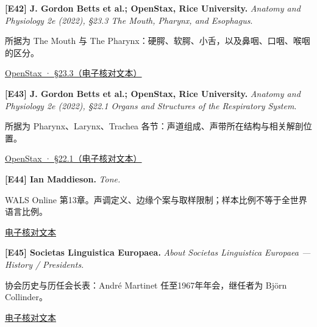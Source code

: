 \par\noindent\begin{minipage}{\linewidth}
\label{ref-42}\noindent\textbf{[E42] J. Gordon Betts et al.; OpenStax, Rice University.} \textit{Anatomy and Physiology 2e (2022), §23.3 The Mouth, Pharynx, and Esophagus}.\par\nobreak
所据为 The Mouth 与 The Pharynx：硬腭、软腭、小舌，以及鼻咽、口咽、喉咽的区分。\par
{\small\href{https://openstax.org/books/anatomy-and-physiology-2e/pages/23-3-the-mouth-pharynx-and-esophagus}{OpenStax · §23.3（电子核对文本）}}\par
\par\end{minipage}\par

\par\noindent\begin{minipage}{\linewidth}
\label{ref-43}\noindent\textbf{[E43] J. Gordon Betts et al.; OpenStax, Rice University.} \textit{Anatomy and Physiology 2e (2022), §22.1 Organs and Structures of the Respiratory System}.\par\nobreak
所据为 Pharynx、Larynx、Trachea 各节：声道组成、声带所在结构与相关解剖位置。\par
{\small\href{https://openstax.org/books/anatomy-and-physiology-2e/pages/22-1-organs-and-structures-of-the-respiratory-system}{OpenStax · §22.1（电子核对文本）}}\par
\par\end{minipage}\par

\par\noindent\begin{minipage}{\linewidth}
\label{ref-44}\noindent\textbf{[E44] Ian Maddieson.} \textit{Tone.}\par\nobreak
WALS Online 第13章。声调定义、边缘个案与取样限制；样本比例不等于全世界语言比例。\par
{\small\href{https://wals.info/chapter/13}{电子核对文本}}\par
\par\end{minipage}\par

\par\noindent\begin{minipage}{\linewidth}
\label{ref-45}\noindent\textbf{[E45] Societas Linguistica Europaea.} \textit{About Societas Linguistica Europaea — History / Presidents.}\par\nobreak
协会历史与历任会长表：André Martinet 任至1967年年会，继任者为 Björn Collinder。\par
{\small\href{https://societaslinguistica.eu/about-societas-linguistica-europaea/}{电子核对文本}}\par
\par\end{minipage}\par


